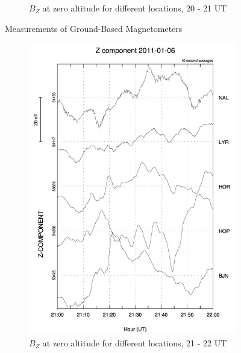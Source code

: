 \documentclass[10pt,a4paper]{article}
\begin{document}
\begin{figure}[h]
\begin{subfigure}[h]{.5\textwidth}
		\caption{$B_Z$ at zero altitude for different locations, 20 - 21 UT}
		\label{mag4}
	\end{subfigure}
	\caption{Measurements of Ground-Based Magnetometers}
	\label{mag}
\end{figure}
\begin{figure}[h]
	\begin{subfigure}[h]{.5\textwidth}
		\centering
		\includegraphics[width=.8\linewidth]{Z_gram4.jpg}
		\caption{$B_Z$ at zero altitude for different locations, 21 - 22 UT}
		\label{mag5}
	\end{subfigure}
	\begin{subfigure}[h]{.5\textwidth}
		\centering

\end{subfigure}
\end{figure}
\end{document}
